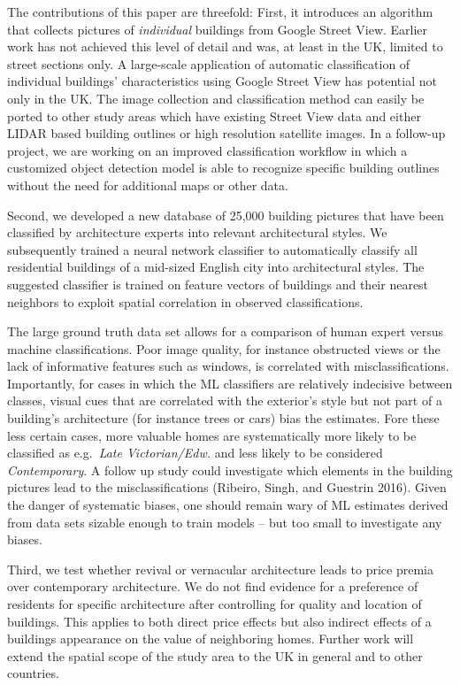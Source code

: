 \documentclass[]{article}
\begin{document}
The contributions of this paper are threefold: First, it introduces an
algorithm that collects pictures of \emph{individual} buildings from
Google Street View. Earlier work has not achieved this level of detail
and was, at least in the UK, limited to street sections only. A
large-scale application of automatic classification of individual
buildings' characteristics using Google Street View has potential not
only in the UK. The image collection and classification method can
easily be ported to other study areas which have existing Street View
data and either LIDAR based building outlines or high resolution
satellite images. In a follow-up project, we are working on an improved
classification workflow in which a customized object detection model is
able to recognize specific building outlines without the need for
additional maps or other data.

Second, we developed a new database of 25,000 building pictures that
have been classified by architecture experts into relevant architectural
styles. We subsequently trained a neural network classifier to
automatically classify all residential buildings of a mid-sized English
city into architectural styles. The suggested classifier is trained on
feature vectors of buildings and their nearest neighbors to exploit
spatial correlation in observed classifications.

The large ground truth data set allows for a comparison of human expert
versus machine classifications. Poor image quality, for instance
obstructed views or the lack of informative features such as windows, is
correlated with misclassifications. Importantly, for cases in which the
ML classifiers are relatively indecisive between classes, visual cues
that are correlated with the exterior's style but not part of a
building's architecture (for instance trees or cars) bias the estimates.
Fore these less certain cases, more valuable homes are systematically
more likely to be classified as e.g.~\emph{Late Victorian/Edw.} and less
likely to be considered \emph{Contemporary}. A follow up study could
investigate which elements in the building pictures lead to the
misclassifications (Ribeiro, Singh, and Guestrin 2016). Given the danger
of systematic biases, one should remain wary of ML estimates derived
from data sets sizable enough to train models -- but too small to
investigate any biases.

Third, we test whether revival or vernacular architecture leads to price
premia over contemporary architecture. We do not find evidence for a
preference of residents for specific architecture after controlling for
quality and location of buildings. This applies to both direct price
effects but also indirect effects of a buildings appearance on the value
of neighboring homes. Further work will extend the spatial scope of the
study area to the UK in general and to other countries.
\end{document}
